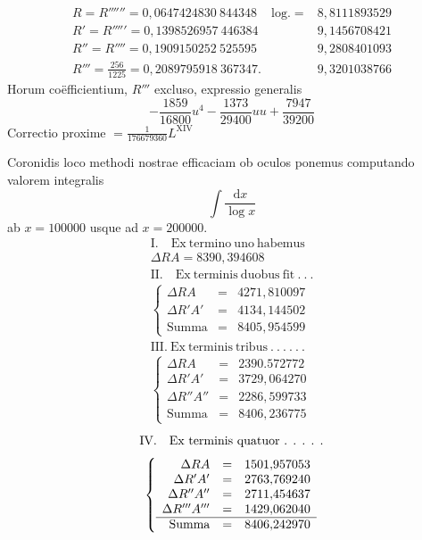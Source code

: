 \[
\begin{array}{lll}
R=R''''''=0{,}0647424830\ 844348&\mathrm{log.}=&8{,}8111893529\\
R'=R'''''=0{,}1398526957\ 446384&&9{,}1456708421\\
R''=R''''=0{,}1909150252\ 525595&&9{,}2808401093\\
R'''=\frac{256}{1225}=0{,}2089795918\ 367347.&&9{,}3201038766
\end{array}
\]
\noindent Horum co\"efficientium, \(R'''\) excluso, expressio generalis
\[
-\frac{1859}{16800}u^4-\frac{1373}{29400}uu+\frac{7947}{39200}
\]
\noindent Correctio proxime \(=\frac{1}{176679360}L^{\mathrm{XIV}}\)

Coronidis loco methodi nostrae efficaciam ob oculos ponemus computando
valorem integralis
\[
\int\frac{\mathrm{d}x}{\log x}
\]
ab \(x=100000\) usque ad \(x=200000\).
\[
\begin{array}{l}
\mathrm{I.\quad Ex\ termino\ uno\ habemus}\\[3pt]\Delta RA=8390{,}394608\\[6pt]
\mathrm{II.\quad Ex\ terminis\ duobus\ fit}\ .\ .\ .\\[3pt]
\left\{\begin{array}{rcl}
\Delta RA&=&4271{,}810097\\
\Delta R'A'&=&4134{,}144502\\\hline
\mathrm{Summa}&=&8405{,}954599
\end{array}\right.\\[8pt]
\mathrm{III.\ Ex\ terminis\ tribus}\ .\ .\ .\ .\ .\ .\\[3pt]
\left\{\begin{array}{rcl}
\Delta RA&=&2390.572772\\
\Delta R'A'&=&3729{,}064270\\
\Delta R''A''&=&2286{,}599733\\\hline
\mathrm{Summa}&=&8406{,}236775
\end{array}\right.
\end{array}
\]
\endgroup
{}
\[
\begin{gathered}\mbox{IV.\quad Ex terminis quatuor . . . . .}\\[3pt]
\left\{\begin{array}{rcl}
\Delta RA&=&1501{,}957053\\
\Delta R'A'&=&2763{,}769240\\
\Delta R''A''&=&2711{,}454637\\
\Delta R'''A'''&=&1429{,}062040\\ \hline
\mbox{Summa}&=&8406{,}242970
\end{array}\right.\end{gathered}
\]
